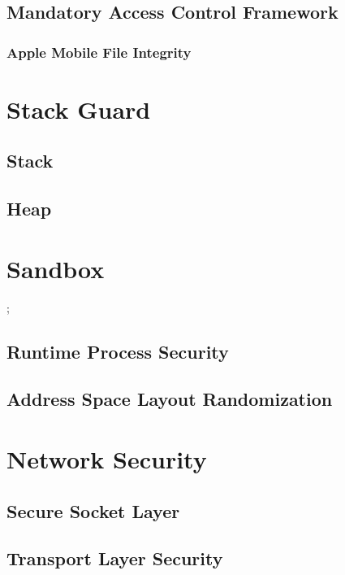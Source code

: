 \subsection{Mandatory Access Control Framework}
\label{sec:MACF}
\subsubsection{Apple Mobile File Integrity}
\label{sec:AMAFI}

\section{Stack Guard}
\label{sec:StackGuard}
\subsection{Stack}
\label{sec:Stack}
\subsection{Heap}
\label{sec:Heap}

\section{Sandbox}
\label{sec:Sandbox}
\cite{sandbox[1]}
\cite{sandbox[2]};


\subsection{Runtime Process Security}
\label{sec:RuntimeProcessSecurity}

\subsection{Address Space Layout Randomization}
\label{sec:ASLR}

\section{Network Security}
\label{sec:NetworkSecurity}

\subsection{Secure Socket Layer}
\label{sec:SSL}

\subsection{Transport Layer Security}
\label{sec:TLS}


